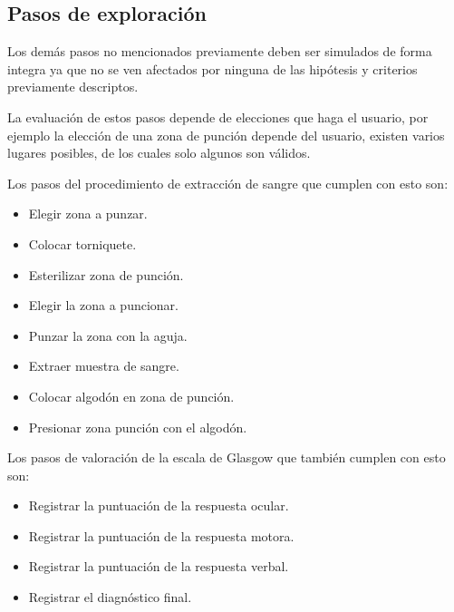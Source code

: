 \subsection{Pasos de exploración}

Los demás pasos no mencionados previamente deben ser simulados de forma 
integra ya que no se ven afectados por ninguna de las hipótesis y criterios previamente
descriptos.

La evaluación de estos pasos depende de elecciones que haga el usuario, por ejemplo
la elección de una zona de punción depende del usuario, existen varios lugares posibles, 
de los cuales solo algunos son válidos. 

Los pasos del procedimiento de extracción de sangre que cumplen con esto son:
\begin{itemize}
    \item Elegir zona a punzar.
    \item Colocar torniquete.
    \item Esterilizar zona de punción.
    \item Elegir la zona a puncionar.
    \item Punzar la zona con la aguja.
    \item Extraer muestra de sangre.
    \item Colocar algodón en zona de punción.
    \item Presionar zona punción con el algodón.
\end{itemize}

Los pasos de valoración de la escala de Glasgow que también cumplen con esto son:
\begin{itemize}
    \item Registrar la puntuación de la respuesta ocular.
    \item Registrar la puntuación de la respuesta motora.
    \item Registrar la puntuación de la  respuesta verbal.
    \item Registrar el diagnóstico final.
\end{itemize}


